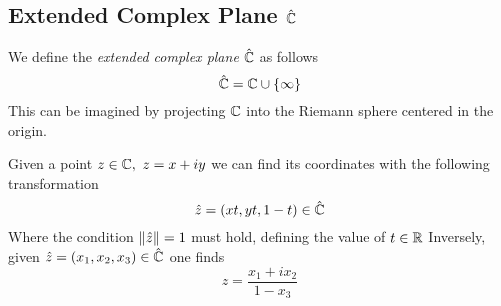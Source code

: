 \documentclass[../complete.tex]{subfiles}
\begin{document}
\subsection{Extended Complex Plane $\hat{\mathbb{C}}$}
\begin{dfn}
	We define the \textit{extended complex plane} $\hat{\mathbb{C}}$ as follows
	\begin{equation}
		\hat{\mathbb{C}}=\mathbb{C}\cup\{\infty\}
		\label{eq:extendedcf}
	\end{equation}
	This can be imagined by projecting $\mathbb{C}$ into the Riemann sphere centered in the origin.
\end{dfn}
\begin{dfn}
	Given a point $z\in\mathbb{C},\ z=x+iy$ we can find its coordinates with the following transformation
	\begin{equation}
		\hat{z}=(xt,yt,1-t)\in\hat{\mathbb{C}}
		\label{eq:pointinhatcf}
	\end{equation}
	Where the condition $\norm{\hat{z}}=1$ must hold, defining the value of $t\in\mathbb{R}$
	Inversely, given $\hat{z}=(x_1,x_2,x_3)\in\hat{\mathbb{C}}$ one finds
	\begin{equation}
		z=\frac{x_1+ix_2}{1-x_3}
		\label{eq:hatcftocf}
	\end{equation}
\end{dfn}
\end{document}
